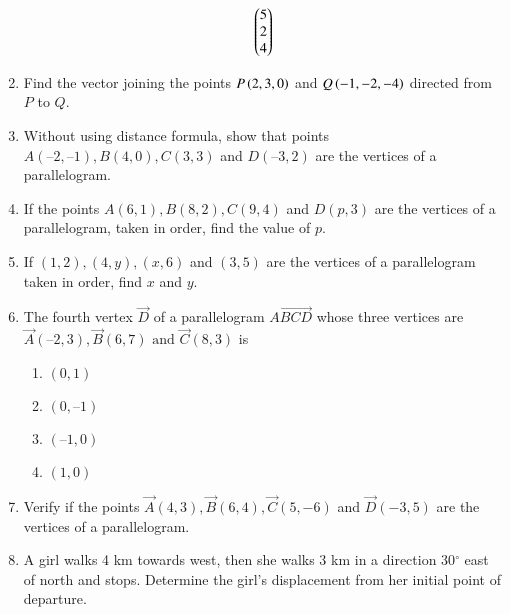 \begin{enumerate}[label=\thesubsection.\arabic*,ref=\thesubsection.\theenumi]
\begin{align}
	\begin{pmatrix}5 \\ 2 \\ 4\end{pmatrix}  
\end{align}
\item Find the vector joining the points $P\left(2,3,0\right)$ and $Q\left(-1,-2,-4\right)$ directed from $P$ to $Q$.
\item Without using distance formula, show that points $A(– 2, – 1), B(4, 0), C(3, 3)$ and $D(–3, 2)$ are the vertices of a parallelogram.
\label{chapters/11/10/1/9}
\\
\solution

\item If the points $A(6, 1), B(8, 2), C(9, 4)$ and $D(p, 3)$ are the vertices of a parallelogram, taken in order, find the value of $p$.
\label{10/7/0/10}
\item 
If $(1, 2), (4, y), (x, 6)$ and $(3, 5)$ are the vertices of a parallelogram taken in order, find $x$ and $y$.
\label{10/7/2/6}
	\\
		\solution
	
\item The fourth vertex $\vec{D}$ of a parallelogram $\vec{ABCD}$ whose three vertices are
	$\vec{A} (–2, 3), \vec{B} (6, 7)\text { and } \vec{C} (8, 3)$ is
\begin{enumerate}
	\item $(0, 1)$
	\item $(0, –1)$
	\item $ (–1,0)$
	\item$(1, 0)$
\end{enumerate}
\item Verify if the points $\vec{A}(4,3), \vec{B}(6,4),\vec{C}(5,-6)$  and  $\vec{D}(-3,5)$ are the vertices of a parallelogram.
\item A girl walks 4 km towards west, then she walks 3 km in a direction 30$^{\circ}$ east of north and stops. Determine the girl's displacement from her initial point of departure.\\
	\solution
		
\end{enumerate}
